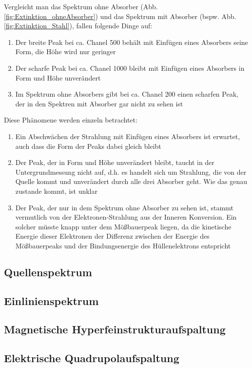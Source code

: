 \documentclass[12pt,a4paper]{article}
\begin{document}
Vergleicht man das Spektrum ohne Absorber (Abb. \ref{fig:Extinktion_ohneAbsorber}) und das Spektrum mit Absorber (bspw. Abb. \ref{fig:Extinktion_Stahl}), fallen folgende Dinge auf:
\begin{enumerate}
\item Der breite Peak bei ca. Chanel 500 behält mit Einfügen eines Absorbers seine Form, die Höhe wird nur geringer
\item Der scharfe Peak bei ca. Chanel 1000 bleibt mit Einfügen eines Absorbers in Form und Höhe unverändert
\item Im Spektrum ohne Absorbers gibt bei ca. Chanel 200 einen scharfen Peak, der in den Spektren mit Absorber gar nicht zu sehen ist
\end{enumerate}
Diese Phänomene werden einzeln betrachtet:
\begin{enumerate}
\item Ein Abschwächen der Strahlung mit Einfügen eines Absorbers ist erwartet, auch dass die Form der Peaks dabei gleich bleibt
\item Der Peak, der in Form und Höhe unverändert bleibt, taucht in der Untergrundmessung nicht auf, d.h. es handelt sich um Strahlung, die von der Quelle kommt und unverändert durch alle drei Absorber geht. Wie das genau zustande kommt, ist unklar
\item Der Peak, der nur in dem Spektrum ohne Absorber zu sehen ist, stammt vermutlich von der Elektronen-Strahlung aus der Inneren Konversion. Ein solcher müsste knapp unter dem Mößbauerpeak liegen, da die kinetische Energie dieser Elektronen der Differenz zwischen der Energie des Mößbauerpeaks und der Bindungsenergie des Hüllenelektrons entspricht
\end{enumerate}

\subsection{Quellenspektrum}
\subsection{Einlinienspektrum}
\subsection{Magnetische Hyperfeinstrukturaufspaltung}
\subsection{Elektrische Quadrupolaufspaltung}
\end{document}
